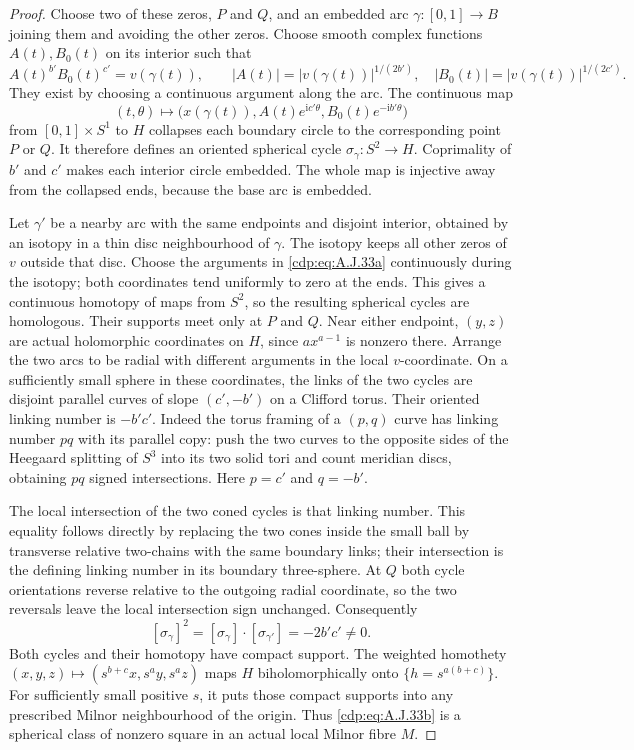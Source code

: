 \begin{proof}
Choose two of these zeros, $P$ and $Q$, and an
embedded arc $\gamma:[0,1]\to B$ joining them and
avoiding the other zeros. Choose smooth complex
functions $A(t),B_0(t)$ on its interior such that
\[
 A(t)^{b'}B_0(t)^{c'}=v(\gamma(t)),\qquad
 |A(t)|=|v(\gamma(t))|^{1/(2b')},\quad
 |B_0(t)|=|v(\gamma(t))|^{1/(2c')}.
\]
They exist by choosing a continuous argument along
the arc. The continuous map
\[
 (t,\theta)\longmapsto
 \bigl(x(\gamma(t)),A(t)e^{\mathrm i c'\theta},
                 B_0(t)e^{-\mathrm i b'\theta}\bigr)
                                                        \tag{A.J.33a}\label{cdp:eq:A.J.33a}
\]
from $[0,1]\times S^1$ to $H$ collapses each boundary
circle to the corresponding point $P$ or $Q$.
It therefore defines an oriented spherical cycle
$\sigma_\gamma:S^2\to H$. Coprimality of $b'$ and
$c'$ makes each interior circle embedded. The whole
map is injective away from the collapsed ends,
because the base arc is embedded.

Let $\gamma'$ be a nearby arc with the same endpoints
and disjoint interior, obtained by an isotopy in a
thin disc neighbourhood of $\gamma$. The isotopy
keeps all other zeros of $v$ outside that disc.
Choose the arguments in \eqref{cdp:eq:A.J.33a} continuously during
the isotopy; both coordinates tend uniformly to zero
at the ends. This gives a continuous homotopy of
maps from $S^2$, so the resulting spherical cycles
are homologous. Their supports meet only at $P$ and
$Q$. Near either endpoint, $(y,z)$ are actual
holomorphic coordinates on $H$, since $a x^{a-1}$
is nonzero there. Arrange the two arcs to be radial
with different arguments in the local $v$-coordinate.
On a sufficiently small sphere in these coordinates,
the links of the two cycles are disjoint parallel
curves of slope $(c',-b')$ on a Clifford torus.
Their oriented linking number is $-b'c'$.
Indeed the torus framing of a $(p,q)$ curve has
linking number $pq$ with its parallel copy: push the
two curves to the opposite sides of the Heegaard
splitting of $S^3$ into its two solid tori and count
meridian discs, obtaining $p q$ signed intersections.
Here $p=c'$ and $q=-b'$.

The local intersection of the two coned cycles is
that linking number. This equality follows directly
by replacing the two cones inside the small ball by
transverse relative two-chains with the same boundary
links; their intersection is the defining linking
number in its boundary three-sphere. At $Q$ both
cycle orientations reverse relative to the outgoing
radial coordinate, so the two reversals leave the
local intersection sign unchanged. Consequently
\[
 [\sigma_\gamma]^2
   =[\sigma_\gamma]\cdot[\sigma_{\gamma'}]
   =-2b'c'\ne0.                                  \tag{A.J.33b}\label{cdp:eq:A.J.33b}
\]
Both cycles and their homotopy have compact support.
The weighted homothety
$(x,y,z)\mapsto(s^{b+c}x,s^a y,s^a z)$ maps
$H$ biholomorphically onto $\{h=s^{a(b+c)}\}$.
For sufficiently small positive $s$, it puts those
compact supports into any prescribed Milnor
neighbourhood of the origin. Thus \eqref{cdp:eq:A.J.33b} is a
spherical class of nonzero square in an actual
local Milnor fibre $M$.


\end{proof}
